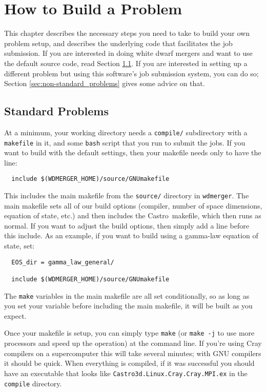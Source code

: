 \documentclass[12pt]{book}
\newcommand{\castro}{{\sf Castro}}
\begin{document}
\chapter{How to Build a Problem}

This chapter describes the necessary steps you need to take to build your own problem setup,
and describes the underlying code that facilitates the job submission. If you are interested in
doing white dwarf mergers and want to use the default source code, read Section \ref{sec:standard_problems}.
If you are interested in setting up a different problem but using this software's job submission 
system, you can do so; Section \ref{sec:non-standard_problems} gives some advice on that.

\section{Standard Problems}
\label{sec:standard_problems}

At a minimum, your working directory needs a \texttt{compile/} subdirectory with a \texttt{makefile}
in it, and some \texttt{bash} script that you run to submit the jobs. If you want to build 
with the default settings, then your makefile needs only to have the line:
\begin{lstlisting}
  include $(WDMERGER_HOME)/source/GNUmakefile
\end{lstlisting}%
This includes the main makefile from the \texttt{source/} directory in \texttt{wdmerger}. 
The main makefile sets all of our build options (compiler, number of space dimensions, 
equation of state, etc.) and then includes the \castro\ makefile, which then runs as normal.
If you want to adjust the build options, then simply add a line before this include. As an 
example, if you want to build using a gamma-law equation of state, set:
\begin{lstlisting}
  EOS_dir = gamma_law_general/

  include $(WDMERGER_HOME)/source/GNUmakefile 
\end{lstlisting}%

The \texttt{make} variables in the main makefile are all set conditionally, so as long 
as you set your variable before including the main makefile, it will be built as you expect.

Once your makefile is setup, you can simply type \texttt{make} (or \texttt{make -j} 
to use more processors and speed up the operation) at the command line. 
If you're using Cray compilers on a supercomputer this will take several minutes;
with GNU compilers it should be quick. When everything is compiled, if it was
successful you should have an executable that looks like \texttt{Castro3d.Linux.Cray.Cray.MPI.ex}
in the \texttt{compile} directory.
\end{document}
